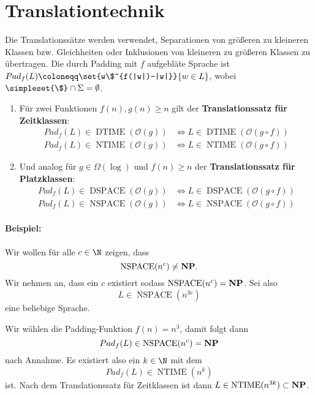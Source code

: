 \section{Translationtechnik}
Die Translationssätze werden verwendet, Separationen von größeren zu kleineren Klassen bzw. Gleichheiten oder Inklusionen von kleineren zu größeren Klassen zu übertragen.
Die durch Padding mit $f$ aufgebläte Sprache ist $Pad_f(L)\coloneqq \set{w\$^{f(|w|)-|w|}}{w\in L}$, wobei $\simpleset{\$}\cap\Sigma = \emptyset$.
\begin{enumerate}
	\item Für zwei Funktionen $f(n),g(n)\geq n$ gilt der \textbf{Translationssatz für Zeitklassen}:
	\begin{align*}
		Pad_f(L)\in \operatorname{DTIME}(\mathcal O(g))&\Leftrightarrow L\in \operatorname{DTIME}(\mathcal O(g\circ f))\\
		Pad_f(L)\in \operatorname{NTIME}(\mathcal O(g))&\Leftrightarrow L\in \operatorname{NTIME}(\mathcal O(g\circ f))
	\end{align*}
	\item Und analog für $g\in\Omega(\log)$ und $f(n)\geq n$ der \textbf{Translationssatz für Platzklassen}:
	\begin{align*}
		Pad_f(L)\in \operatorname{DSPACE}(\mathcal O(g))&\Leftrightarrow L\in \operatorname{DSPACE}(\mathcal O(g\circ f))\\
		Pad_f(L)\in \operatorname{NSPACE}(\mathcal O(g))&\Leftrightarrow L\in \operatorname{NSPACE}(\mathcal O(g\circ f))
	\end{align*}
\end{enumerate}

\paragraph{Beispiel:} Wir wollen für alle $c\in\N$ zeigen, dass $$\operatorname{NSPACE}(n^c)\neq \textbf{NP}.$$ 
Wir nehmen an, dass ein $c$ existiert sodass $\operatorname{NSPACE}(n^c)=\textbf{NP}$. 
Sei also
\begin{equation*}
	L\in\operatorname{NSPACE}(n^{3c})
\end{equation*}
eine beliebige Sprache. 

Wir wählen die Padding-Funktion $f(n)=n^3$, damit folgt dann 
\begin{equation*}
	Pad_f(L)\in\operatorname{NSPACE}(n^c)=\textbf{NP}
\end{equation*}
nach Annahme. Es existiert also ein $k\in\N$ mit dem  
\begin{equation*}
	Pad_f(L)\in\operatorname{NTIME}(n^k)
\end{equation*}
ist. Nach dem Translationssatz für Zeitklassen ist dann $L\in \operatorname{NTIME}(n^{3k})\subset \textbf{NP}$. 

